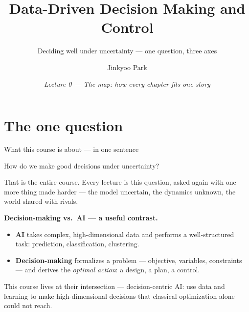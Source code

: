 \documentclass[10pt, aspectratio=169]{beamer}
\title{Data-Driven Decision Making and Control}
\subtitle{Deciding well under uncertainty --- one question, three axes}
\author{Jinkyoo Park}
\institute{KAIST --- Industrial \& Systems Engineering}
\date{\textit{Lecture 0 --- The map: how every chapter fits one story}}
\begin{document}

\maketitle

\section{The one question}

\begin{frame}{What this course is about --- in one sentence}
\begin{center}\large
\alert{How do we make good decisions under uncertainty?}
\end{center}
\medskip

\pause
That is the entire course. Every lecture is this question, asked again with one more thing made harder --- the model uncertain, the dynamics unknown, the world shared with rivals.
\medskip

\pause
\textbf{Decision-making vs.\ AI --- a useful contrast.}
\begin{itemize}\setlength\itemsep{2pt}
\item \textbf{AI} takes complex, high-dimensional data and performs a well-structured task: prediction, classification, clustering.
\item \textbf{Decision-making} formalizes a problem --- objective, variables, constraints --- and derives the \emph{optimal action}: a design, a plan, a control.
\end{itemize}
\medskip
\pause
This course lives at their intersection --- \alert{decision-centric AI}: use data and learning to make high-dimensional decisions that classical optimization alone could not reach.
\end{frame}
\end{document}
